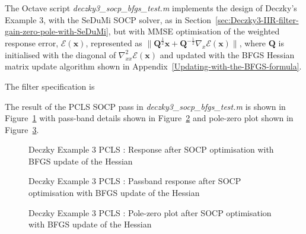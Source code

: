 \documentclass[a4paper,twoside,10pt,english]{report}
\begin{document}
The Octave script \emph{deczky3\_socp\_bfgs\_test.m} implements the design of 
Deczky's Example 3, with the SeDuMi SOCP solver, as in 
Section~\ref{sec:Deczky3-IIR-filter-gain-zero-pole-with-SeDuMi}, but with
MMSE optimisation of the weighted response error, 
$\mathcal{E}\left(\boldsymbol{x}\right)$, represented as $
\|\boldsymbol{Q}^{\frac{1}{2}}\boldsymbol{x}+
\boldsymbol{Q}^{-\frac{1}{2}}\nabla_{x}\mathcal{E}\left(\boldsymbol{x}\right)\|$, 
where $\boldsymbol{Q}$ is initialised with the diagonal of 
$\nabla_{xx}^{2}\mathcal{E}\left(\boldsymbol{x}\right)$ and updated with the
BFGS Hessian matrix update algorithm shown in 
Appendix~\ref{Updating-with-the-BFGS-formula}. 

The filter specification is
\begin{small}

\end{small}

The result of the PCLS SOCP pass in \emph{deczky3\_socp\_bfgs\_test.m} is shown
in Figure~\ref{fig:SOCP-BFGS-Deczky-Example-3-PCLS-d2} with pass-band details 
shown in Figure~\ref{fig:SOCP-BFGS-Deczky-Example-3-PCLS-d2-passband} and 
pole-zero plot shown in Figure~\ref{fig:SOCP-BFGS-Deczky-Example-3-PCLS-d2-pz}.
\begin{figure}[!htbp]
\begin{center}
\scalebox{0.7}{}
\caption{Deczky Example 3 PCLS : Response after SOCP optimisation with BFGS
  update of the Hessian}
\label{fig:SOCP-BFGS-Deczky-Example-3-PCLS-d2}
\end{center}
\end{figure}
\begin{figure}[!htbp]
\begin{center}
\scalebox{0.7}{}
\caption{Deczky Example 3 PCLS : Passband response after SOCP optimisation with BFGS update of the Hessian}
\label{fig:SOCP-BFGS-Deczky-Example-3-PCLS-d2-passband}
\end{center}
\end{figure}
\begin{figure}[!htbp]
\begin{center}
\scalebox{0.7}{}
\caption{Deczky Example 3 PCLS : Pole-zero plot after SOCP optimisation with BFGS update of the Hessian}
\label{fig:SOCP-BFGS-Deczky-Example-3-PCLS-d2-pz}
\end{center}
\end{figure}
\end{document}
